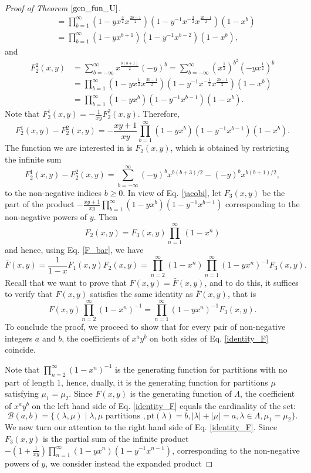 \documentclass[a4paper, 12pt, oneside]{amsart}
\theoremstyle{definition}
\newcommand{\pt}{\mathrm{pt}}
\begin{document}
\begin{proof}[Proof of Theorem $\ref{gen_fun_U}$]
\begin{align*}
&=\prod_{b=1}^{\infty}(1-yx^{\frac{3}{2}}x^{\frac{2b-1}{2}})(1-y^{-1}x^{-\frac{3}{2}}x^{\frac{2b-1}{2}})(1-x^b)\\
&=\prod_{b=1}^{\infty}(1-yx^{b+1})(1-y^{-1}x^{b-2})(1-x^b),
\end{align*}
and
\begin{align*}
F_2^2(x,y)&=\sum_{b=-\infty}^{\infty}x^{\frac{b(b+1)}{2}}(-y)^b=\sum_{b=-\infty}^{\infty}(x^{\frac{1}{2}})^{b^2}(-yx^{\frac{1}{2}})^b \\
&=\prod_{b=1}^{\infty}(1-yx^{\frac{1}{2}}x^{\frac{2b-1}{2}})(1-y^{-1}x^{-\frac{1}{2}}x^{\frac{2b-1}{2}})(1-x^b)\\
&=\prod_{b=1}^{\infty}(1-yx^{b})(1-y^{-1}x^{b-1})(1-x^b).
\end{align*}
Note that $F_2^1(x,y)=-\frac{1}{xy}F_2^2(x,y)$. Therefore,
\begin{equation}
\label{jacobi}
F_2^1(x,y)-F_2^2(x,y)=-\frac{xy+1}{xy}\prod_{b=1}^{\infty}(1-yx^b)(1-y^{-1}x^{b-1})(1-x^b).
\end{equation}
The function we are interested in is $F_2(x,y)$, which is obtained by restricting the infinite sum 
$$F_2^1(x,y)-F_2^2(x,y)=\sum_{b=-\infty}^{\infty}(-y)^bx^{b(b+3)/2}-(-y)^bx^{b(b+1)/2},$$ 
to the non-negative indices $b \ge 0$. In view of Eq. \eqref{jacobi}, let $F_3(x,y)$ be the part of the product $-\frac{xy+1}{xy}\prod_{b=1}^{\infty}(1-yx^b)(1-y^{-1}x^{b-1})$ corresponding to the non-negative powers of $y$.
Then
$$F_2(x,y)=F_3(x,y)\prod_{n=1}^{\infty}(1-x^n)$$
and hence, using Eq. \eqref{F_bar}, we have
$$\bar{F}(x,y)=\frac{1}{1-x}F_1(x,y)F_2(x,y)=\prod_{n=2}^{\infty}(1-x^n)\prod_{n=1}^{\infty}(1-yx^n)^{-1}F_3(x,y).$$
Recall that we want to prove that $F(x,y)=\bar{F}(x,y)$, and to do this, it suffices to verify that $F(x,y)$ satisfies the same identity as $\bar{F}(x,y)$, that is
\begin{equation}
\label{identity_F}
F(x,y)\prod_{n=2}^{\infty}(1-x^n)^{-1}=\prod_{n=1}^{\infty}(1-yx^{n})^{-1}F_3(x,y).
\end{equation}
To conclude the proof, we proceed to show that for every pair of non-negative integers $a$ and $b$, the coefficients of $x^ay^b$ on both sides of Eq. \eqref{identity_F} coincide.

Note that $\prod_{n=2}^{\infty}(1-x^n)^{-1}$ is the generating function for partitions with no part of length 1, hence, dually, it is the generating function for partitions $\mu$ satisfying $\mu_1=\mu_2$. Since $F(x,y)$ is the generating function of $\Lambda$, the coefficient of $x^ay^b$ on the left hand side of Eq. \eqref{identity_F} equals the cardinality of the set:
\begin{equation}
\label{B(a,b)}
\mathcal{B}(a,b) =\{(\lambda,\mu) \mid \lambda, \mu \text{ partitions }, \pt(\lambda)=b, |\lambda|+|\mu|=a, \lambda \in \Lambda, \mu_1=\mu_2 \}.
\end{equation}
We now turn our attention to the right hand side of Eq. \eqref{identity_F}. Since $  F_3(x,y)$ is the partial sum  of the infinite product $-\left(1+\frac{1}{xy}\right)\prod_{n=1}^{\infty}(1-yx^n)(1-y^{-1}x^{n-1})$,
corresponding to the non-negative powers of $y$, we consider instead the expanded product


\end{proof}
\end{document}
